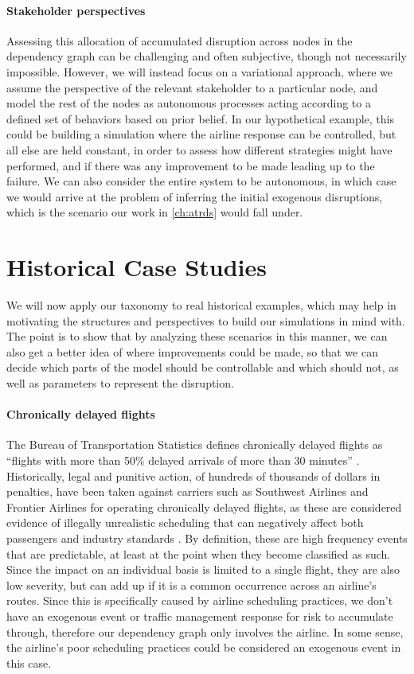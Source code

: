 \paragraph{Stakeholder perspectives} Assessing this allocation of accumulated disruption across nodes in the dependency graph can be challenging and often subjective, though not necessarily impossible. However, we will instead focus on a variational approach, where we assume the perspective of the relevant stakeholder to a particular node, and model the rest of the nodes as autonomous processes acting according to a defined set of behaviors based on prior belief. In our hypothetical example, this could be building a simulation where the airline response can be controlled, but all else are held constant, in order to assess how different strategies might have performed, and if there was any improvement to be made leading up to the failure. We can also consider the entire system to be autonomous, in which case we would arrive at the problem of inferring the initial exogenous disruptions, which is the scenario our work in \cref{ch:atrds} would fall under.

\section{Historical Case Studies}

We will now apply our taxonomy to real historical examples, which may help in motivating the structures and perspectives to build our simulations in mind with. The point is to show that by analyzing these scenarios in this manner, we can also get a better idea of where improvements could be made, so that we can decide which parts of the model should be controllable and which should not, as well as parameters to represent the disruption.


\paragraph{Chronically delayed flights} The Bureau of Transportation Statistics defines chronically delayed flights as ``flights with more than 50\% delayed arrivals of more than 30 minutes'' \cite{bts_chronic}. Historically, legal and punitive action, of hundreds of thousands of dollars in penalties, have been taken against carriers such as Southwest Airlines and Frontier Airlines for operating chronically delayed flights, as these are considered evidence of illegally unrealistic scheduling that can negatively affect both passengers and industry standards \cite{southwest_chronic_2025}. By definition, these are high frequency events that are predictable, at least at the point when they become classified as such. Since the impact on an individual basis is limited to a single flight, they are also low severity, but can add up if it is a common occurrence across an airline's routes. Since this is specifically caused by airline scheduling practices, we don't have an exogenous event or traffic management response for risk to accumulate through, therefore our dependency graph only involves the airline. In some sense, the airline's poor scheduling practices could be considered an exogenous event in this case.

